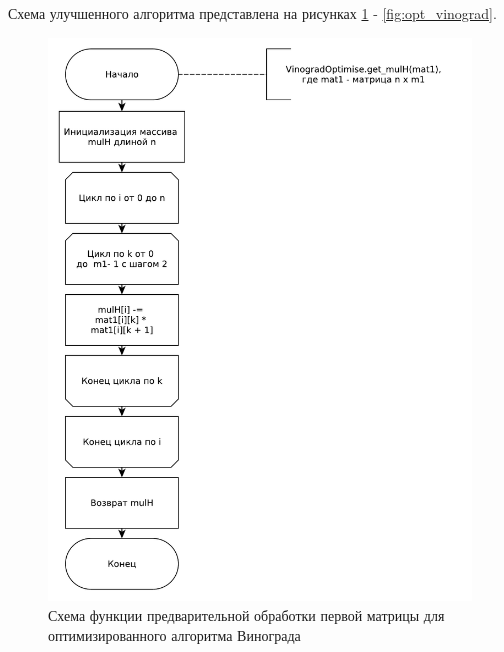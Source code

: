 \documentclass[a4paper,oneside,14pt]{extreport}
\begin{document}
Схема улучшенного алгоритма представлена на рисунках \ref{fig:opt_vin_mulh} - \ref{fig:opt_vinograd}.


\begin{figure}[H]
	\centering
	\includegraphics[width=0.9\linewidth]{images/vinogradOptimise_get_mulh}
	\caption{Схема функции предварительной обработки первой матрицы для оптимизированного алгоритма Винограда}
	\label{fig:opt_vin_mulh}
\end{figure}
\end{document}
